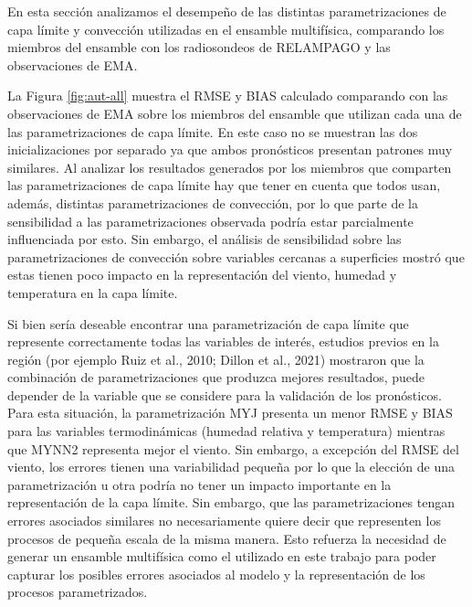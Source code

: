 \documentclass[12pt,oneside,a4paper]{reedthesis}
\begin{document}
En esta sección analizamos el desempeño de las distintas parametrizaciones de capa límite y convección utilizadas en el ensamble multifísica, comparando los miembros del ensamble con los radiosondeos de RELAMPAGO y las observaciones de EMA.

La Figura \ref{fig:aut-all} muestra el RMSE y BIAS calculado comparando con las observaciones de EMA sobre los miembros del ensamble que utilizan cada una de las parametrizaciones de capa límite. En este caso no se muestran las dos inicializaciones por separado ya que ambos pronósticos presentan patrones muy similares. Al analizar los resultados generados por los miembros que comparten las parametrizaciones de capa límite hay que tener en cuenta que todos usan, además, distintas parametrizaciones de convección, por lo que parte de la sensibilidad a las parametrizaciones observada podría estar parcialmente influenciada por esto. Sin embargo, el análisis de sensibilidad sobre las parametrizaciones de convección sobre variables cercanas a superficies mostró que estas tienen poco impacto en la representación del viento, humedad y temperatura en la capa límite.

Si bien sería deseable encontrar una parametrización de capa límite que represente correctamente todas las variables de interés, estudios previos en la región (por ejemplo Ruiz et al., 2010; Dillon et al., 2021) mostraron que la combinación de parametrizaciones que produzca mejores resultados, puede depender de la variable que se considere para la validación de los pronósticos. Para esta situación, la parametrización MYJ presenta un menor RMSE y BIAS para las variables termodinámicas (humedad relativa y temperatura) mientras que MYNN2 representa mejor el viento. Sin embargo, a excepción del RMSE del viento, los errores tienen una variabilidad pequeña por lo que la elección de una parametrización u otra podría no tener un impacto importante en la representación de la capa límite. Sin embargo, que las parametrizaciones tengan errores asociados similares no necesariamente quiere decir que representen los procesos de pequeña escala de la misma manera. Esto refuerza la necesidad de generar un ensamble multifísica como el utilizado en este trabajo para poder capturar los posibles errores asociados al modelo y la representación de los procesos parametrizados.
\end{document}
